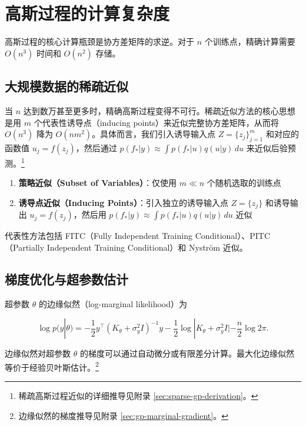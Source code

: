 \section{高斯过程的计算复杂度}\label{sec:gp-computation}

高斯过程的核心计算瓶颈是协方差矩阵的求逆。对于 $n$ 个训练点，精确计算需要 $O(n^3)$ 时间和 $O(n^2)$ 存储。

\subsection{大规模数据的稀疏近似}

当 $n$ 达到数万甚至更多时，精确高斯过程变得不可行。稀疏近似方法的核心思想是用 $m$ 个代表性诱导点（inducing points）来近似完整协方差矩阵，从而将 $O(n^3)$ 降为 $O(n m^2)$。具体而言，我们引入诱导输入点 $Z = \{z_j\}_{j=1}^m$ 和对应的函数值 $u_j = f(z_j)$，然后通过 $p(f_* | y) \approx \int p(f_* | u) q(u | y) \, du$ 来近似后验预测。\footnote{稀疏高斯过程近似的详细推导见附录 \cref{sec:sparse-gp-derivation}。}

\begin{enumerate}
  \item \textbf{策略近似（Subset of Variables）}：仅使用 $m \ll n$ 个随机选取的训练点
  \item \textbf{诱导点近似（Inducing Points）}：引入独立的诱导输入点 $Z = \{z_j\}$ 和诱导输出 $u_j = f(z_j)$，然后用 $p(f_* | y) \approx \int p(f_* | u) q(u | y) \, du$ 近似
\end{enumerate}

代表性方法包括 FITC（Fully Independent Training Conditional）、PITC（Partially Independent Training Conditional）和 Nystr\"om 近似。

\subsection{梯度优化与超参数估计}

超参数 $\theta$ 的边缘似然（log-marginal likelihood）为

\begin{equation}
\log p(y | \theta) = -\frac{1}{2} y^\top (K_\theta + \sigma_y^2 I)^{-1} y - \frac{1}{2} \log |K_\theta + \sigma_y^2 I| - \frac{n}{2} \log 2\pi. \label{eq:gp-marginal-likelihood}
\end{equation}

边缘似然对超参数 $\theta$ 的梯度可以通过自动微分或有限差分计算。最大化边缘似然等价于经验贝叶斯估计。\footnote{边缘似然的梯度推导见附录 \cref{sec:gp-marginal-gradient}。}

